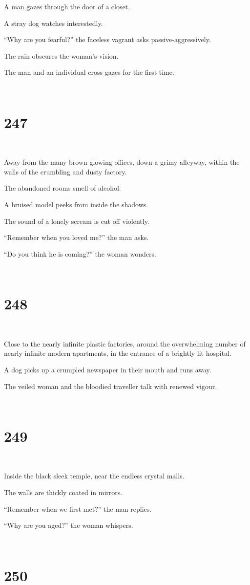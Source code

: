 \documentclass{report}
\begin{document}
A man gazes through the door of a closet.

A stray dog watches interestedly.

``Why are you fearful?'' the faceless vagrant asks passive-aggressively.

The rain obscures the woman's vision.

The man and an individual cross gazes for the first time.

~
\chapter*{247}
~

Away from the many brown glowing offices, down a grimy alleyway, within the walls of the crumbling and dusty factory.

The abandoned rooms smell of alcohol.

A bruised model peeks from inside the shadows.

The sound of a lonely scream is cut off violently.

``Remember when you loved me?'' the man asks.

``Do you think he is coming?'' the woman wonders.

~
\chapter*{248}
~

Close to the nearly infinite plastic factories, around the overwhelming number of nearly infinite modern apartments, in the entrance of a brightly lit hospital.

A dog picks up a crumpled newspaper in their mouth and runs away.

The veiled woman and the bloodied traveller talk with renewed vigour.

~
\chapter*{249}
~

Inside the black sleek temple, near the endless crystal malls.

The walls are thickly coated in mirrors.

``Remember when we first met?'' the man replies.

``Why are you aged?'' the woman whispers.

~
\chapter*{250}
~
\end{document}
